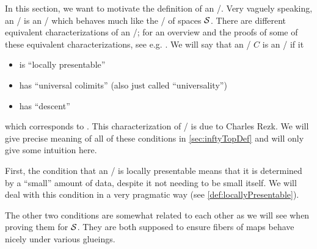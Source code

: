 In this section, we want to motivate the definition of an \inftytop/.
Very vaguely speaking, an \inftytop/ is an \inftycat/ which behaves much like the \inftycat/ of spaces $\mathcal{S}$.
There are different equivalent characterizations of an \inftytop/; for an overview and the proofs of some of these equivalent characterizations, see e.g. \cite[\S 6.1]{HTT}.
We will say that an \inftycat/ $C$ is an \inftytop/ if it 
\begin{itemize} 
    \item is ``locally presentable''
    \item has ``universal colimits'' (also just called ``universality'')
    \item has ``descent'' 
\end{itemize}
which corresponds to \cite[Theorem 6.1.0.6 (2)]{HTT}.
This characterization of \inftytops/ is due to Charles Rezk.
We will give precise meaning of all of these conditions in \cref{sec:inftyTopDef} and will only give some intuition here.

First, the condition that an \inftycat/ is locally presentable means that it is determined by a ``small'' amount of data, despite it not needing to be small itself.
We will deal with this condition in a very pragmatic way (see \cref{def:locallyPresentable}).

The other two conditions are somewhat related to each other as we will see when proving them for $\mathcal{S}$.
They are both supposed to ensure fibers of maps behave nicely under various glueings.

